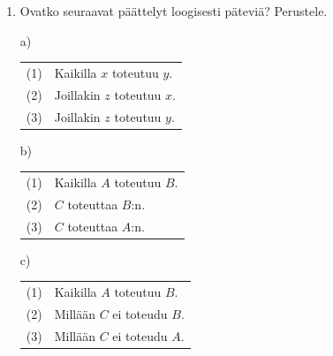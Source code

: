 \begin{enumerate}
\item
Ovatko seuraavat päättelyt loogisesti päteviä? Perustele.

a)  
\begin{tabular}{ll}
 (1) & Kaikilla $x$ toteutuu $y$.  \\
 (2) & Joillakin $z$ toteutuu $x$. \\ \hline
 (3) &  Joillakin $z$ toteutuu $y$.
\end{tabular}

b)  
\begin{tabular}{ll}
(1) & Kaikilla $A$ toteutuu $B$.\\
(2) & $C$ toteuttaa $B$:n. \\ \hline
(3) & $C$ toteuttaa $A$:n.
\end{tabular}

c)  
\begin{tabular}{ll}
(1) & Kaikilla $A$ toteutuu $B$.\\
(2) & Millään $C$ ei toteudu $B$.\\ \hline
(3) & Millään $C$ ei toteudu $A$.
\end{tabular}

\end{enumerate}

